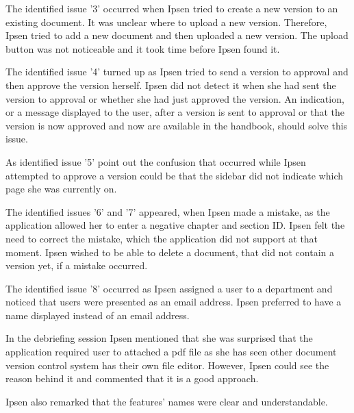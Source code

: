 The identified issue '3' occurred when Ipsen tried to create a new version to an existing document.
It was unclear where to upload a new version.
Therefore, Ipsen tried to add a new document and then uploaded a new version.
The upload button was not noticeable and it took time before Ipsen found it.

The identified issue '4' turned up as Ipsen tried to send a version to approval and then approve the version herself.
Ipsen did not detect it when she had sent the version to approval or whether she had just approved the version.
An indication, or a message displayed to the user, after a version is sent to approval or that the version is now approved and now are available in the handbook, should solve this issue. 

As identified issue '5' point out the confusion that occurred while Ipsen attempted to approve a version could be that the sidebar did not indicate which page she was currently on.

The identified issues '6' and '7' appeared, when Ipsen made a mistake, as the application allowed her to enter a negative chapter and section ID.
Ipsen felt the need to correct the mistake, which the application did not support at that moment.
Ipsen wished to be able to delete a document, that did not contain a version yet, if a mistake occurred.

The identified issue '8' occurred as Ipsen assigned a user to a department and noticed that users were presented as an email address.
Ipsen preferred to have a name displayed instead of an email address.

In the debriefing session Ipsen mentioned that she was surprised that the application required user to attached a pdf file as she has seen other document version control system has their own file editor.
However, Ipsen could see the reason behind it and commented that it is a good approach.

Ipsen also remarked that the features' names were clear and understandable.

